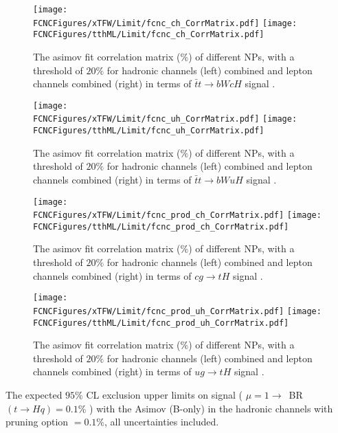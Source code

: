 \begin{figure}[H]
\centering
\texttt{[image: \\FCNCFigures/xTFW/Limit/fcnc\_ch\_CorrMatrix.pdf]}
\texttt{[image: \\FCNCFigures/tthML/Limit/fcnc\_ch\_CorrMatrix.pdf]}
\caption{ The asimov fit correlation matrix ($\%$) of different NPs, with a threshold of $20\%$ for hadronic channels (left) combined and lepton channels combined (right) in terms of $\bar{t}t\to bWcH$ signal . }
\label{fig:fcnc_ch_CorrMatrix}
\end{figure}

\begin{figure}[H]
\centering
\texttt{[image: \\FCNCFigures/xTFW/Limit/fcnc\_uh\_CorrMatrix.pdf]}
\texttt{[image: \\FCNCFigures/tthML/Limit/fcnc\_uh\_CorrMatrix.pdf]}
\caption{ The asimov fit correlation matrix ($\%$) of different NPs, with a threshold of $20\%$ for hadronic channels (left) combined and lepton channels combined (right) in terms of $\bar{t}t\to bWuH$ signal . }
\label{fig:fcnc_uh_CorrMatrix}
\end{figure}

\begin{figure}[H]
\centering
\texttt{[image: \\FCNCFigures/xTFW/Limit/fcnc\_prod\_ch\_CorrMatrix.pdf]}
\texttt{[image: \\FCNCFigures/tthML/Limit/fcnc\_prod\_ch\_CorrMatrix.pdf]}
\caption{ The asimov fit correlation matrix ($\%$) of different NPs, with a threshold of $20\%$ for hadronic channels (left) combined and lepton channels combined (right) in terms of $cg\to tH$ signal . }
\label{fig:fcnc_prod_ch_CorrMatrix}
\end{figure}

\begin{figure}[H]
\centering
\texttt{[image: \\FCNCFigures/xTFW/Limit/fcnc\_prod\_uh\_CorrMatrix.pdf]}
\texttt{[image: \\FCNCFigures/tthML/Limit/fcnc\_prod\_uh\_CorrMatrix.pdf]}
\caption{ The asimov fit correlation matrix ($\%$) of different NPs, with a threshold of $20\%$ for hadronic channels (left) combined and lepton channels combined (right) in terms of $ug\to tH$ signal . }
\label{fig:fcnc_prod_uh_CorrMatrix}
\end{figure}




\begin{table}
\caption{The expected $95\%$ CL exclusion upper limits on signal ( $\mu=1\to$~BR$(t\to Hq)=0.1\%$ ) with the Asimov (B-only) in the hadronic channels with pruning option $=0.1\%$, all uncertainties included.}
\label{tab:limit_pruned}

\end{table}



\newpage